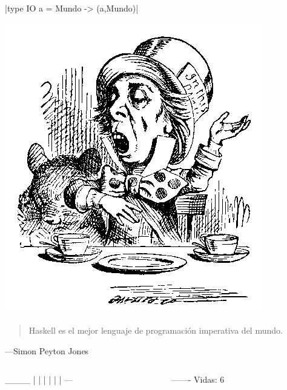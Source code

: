 \documentclass[spanish]{beamer}
\begin{document}

\begin{frame}[fragile]
  \begin{center}
    |type IO a = Mundo -> (a,Mundo)|
  \end{center}
  \begin{center}
    \includegraphics[scale=0.3]{hatter}
  \end{center}
\end{frame}


\begin{frame}
  \begin{quote}
    Haskell es el mejor lenguaje de programación imperativa del mundo.
  \end{quote}
  \hfill---Simon Peyton Jones
\end{frame}


\begin{frame}[fragile]
  \begin{columns}[onlytextwidth,T]
    \begin{column}{.5\textwidth}
        \begin{code}
  ____
  |  |
  |
  |
  |
  |
 ---
        \end{code}
    \end{column}
    \begin{column}{.5\textwidth}
      \begin{code}


 -------          Vidas: 6




      \end{code}
    \end{column}
  \end{columns}
\end{frame}
\end{document}
